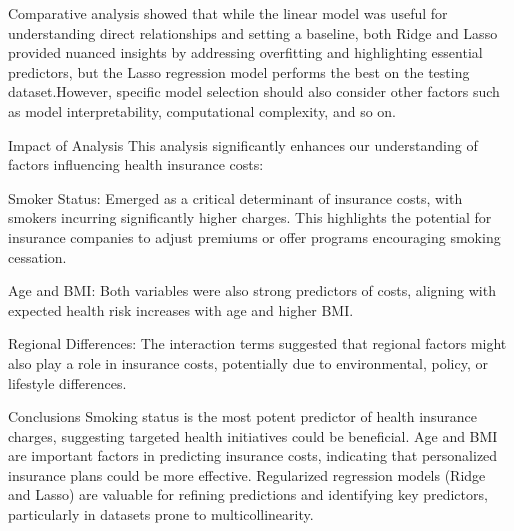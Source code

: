 \documentclass[
  12pt,
]{article}
\begin{document}
Comparative analysis showed that while the linear model was useful for
understanding direct relationships and setting a baseline, both Ridge
and Lasso provided nuanced insights by addressing overfitting and
highlighting essential predictors, but the Lasso regression model
performs the best on the testing dataset.However, specific model
selection should also consider other factors such as model
interpretability, computational complexity, and so on.

Impact of Analysis This analysis significantly enhances our
understanding of factors influencing health insurance costs:

Smoker Status: Emerged as a critical determinant of insurance costs,
with smokers incurring significantly higher charges. This highlights the
potential for insurance companies to adjust premiums or offer programs
encouraging smoking cessation.

Age and BMI: Both variables were also strong predictors of costs,
aligning with expected health risk increases with age and higher BMI.

Regional Differences: The interaction terms suggested that regional
factors might also play a role in insurance costs, potentially due to
environmental, policy, or lifestyle differences.

Conclusions Smoking status is the most potent predictor of health
insurance charges, suggesting targeted health initiatives could be
beneficial. Age and BMI are important factors in predicting insurance
costs, indicating that personalized insurance plans could be more
effective. Regularized regression models (Ridge and Lasso) are valuable
for refining predictions and identifying key predictors, particularly in
datasets prone to multicollinearity.
\end{document}
